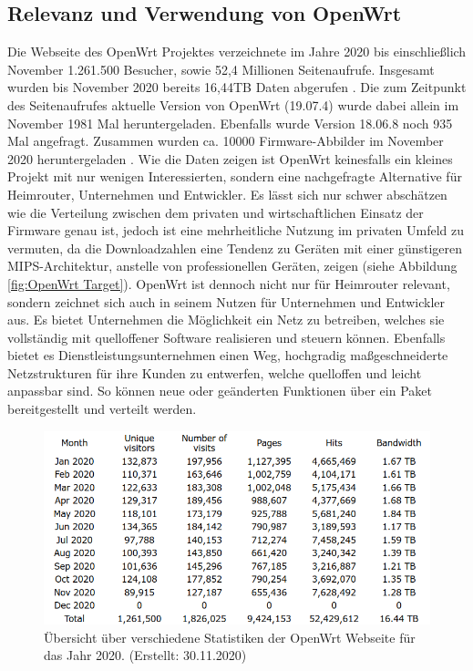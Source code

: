\documentclass[a4paper]{book}
\begin{document}
\begin{large}
\section{Relevanz und Verwendung von OpenWrt}
\label{OpenWrt Relevanz}
\begin{onehalfspace}
Die Webseite des OpenWrt Projektes verzeichnete im Jahre 2020 bis einschließlich November 1.261.500 Besucher, sowie 52,4 Millionen Seitenaufrufe. Insgesamt wurden bis November 2020 bereits 16,44TB Daten abgerufen \cite{OpenWrtWebseite.29.11.2020}. Die zum Zeitpunkt des Seitenaufrufes aktuelle Version von OpenWrt (19.07.4) wurde dabei allein im November 1981 Mal heruntergeladen. Ebenfalls wurde Version 18.06.8 noch 935 Mal angefragt. Zusammen wurden ca. 10000 Firmware-Abbilder im November 2020 heruntergeladen \cite{OpenWrtWebseite.29.11.2020}. Wie die Daten zeigen ist OpenWrt keinesfalls ein kleines Projekt mit nur wenigen Interessierten, sondern eine nachgefragte Alternative für Heimrouter, Unternehmen und Entwickler. Es lässt sich nur schwer abschätzen wie die Verteilung zwischen dem privaten und wirtschaftlichen Einsatz der Firmware genau ist, jedoch ist eine mehrheitliche Nutzung im privaten Umfeld zu vermuten, da die Downloadzahlen eine Tendenz zu Geräten mit einer günstigeren MIPS-Architektur, anstelle von professionellen Geräten, zeigen (siehe Abbildung \ref{fig:OpenWrt Target}). OpenWrt ist dennoch nicht nur für Heimrouter relevant, sondern zeichnet sich auch in seinem Nutzen für Unternehmen und Entwickler aus. Es bietet Unternehmen die Möglichkeit ein Netz zu betreiben, welches sie vollständig mit quelloffener Software realisieren und steuern können. Ebenfalls bietet es Dienstleistungsunternehmen einen Weg, hochgradig maßgeschneiderte Netzstrukturen für ihre Kunden zu entwerfen, welche quelloffen und leicht anpassbar sind. So können neue oder geänderten Funktionen über ein Paket bereitgestellt und verteilt werden. \newline

\begin{figure}[htb]
\begin{center}
\includegraphics[scale=0.6]{images/openwrt_downloads.png} 
\caption{Übersicht über verschiedene Statistiken der OpenWrt Webseite für das Jahr 2020. (Erstellt: 30.11.2020)}
\label{fig:OpenWrt Webseiten Statistik im Jahr 2020 (ohne Dezember)}


\end{center}
\end{figure}
\end{onehalfspace}
\end{large}
\end{document}
